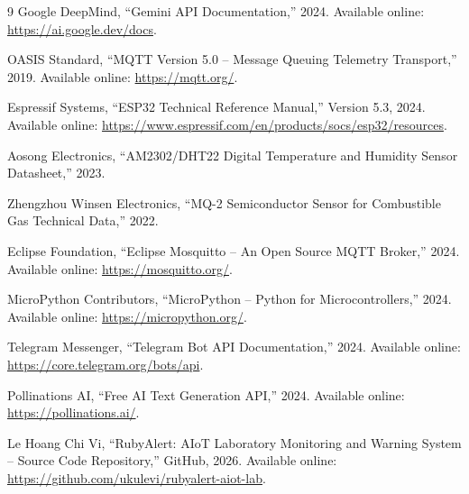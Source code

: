 \documentclass[12pt,a4paper]{report}
\begin{document}
\begin{thebibliography}{9}
    Google DeepMind, ``Gemini API Documentation,'' 2024. Available online: \url{https://ai.google.dev/docs}.
    
    OASIS Standard, ``MQTT Version 5.0 -- Message Queuing Telemetry Transport,'' 2019. Available online: \url{https://mqtt.org/}.
    
    Espressif Systems, ``ESP32 Technical Reference Manual,'' Version 5.3, 2024. Available online: \url{https://www.espressif.com/en/products/socs/esp32/resources}.
    
    Aosong Electronics, ``AM2302/DHT22 Digital Temperature and Humidity Sensor Datasheet,'' 2023.
    
    Zhengzhou Winsen Electronics, ``MQ-2 Semiconductor Sensor for Combustible Gas Technical Data,'' 2022.
    
    Eclipse Foundation, ``Eclipse Mosquitto -- An Open Source MQTT Broker,'' 2024. Available online: \url{https://mosquitto.org/}.
    
    MicroPython Contributors, ``MicroPython -- Python for Microcontrollers,'' 2024. Available online: \url{https://micropython.org/}.
    
    Telegram Messenger, ``Telegram Bot API Documentation,'' 2024. Available online: \url{https://core.telegram.org/bots/api}.
    
    Pollinations AI, ``Free AI Text Generation API,'' 2024. Available online: \url{https://pollinations.ai/}.
    
    Le Hoang Chi Vi, ``RubyAlert: AIoT Laboratory Monitoring and Warning System -- Source Code Repository,'' GitHub, 2026. Available online: \url{https://github.com/ukulevi/rubyalert-aiot-lab}.
\end{thebibliography}

\label{LastArabicPage}
\end{document}
